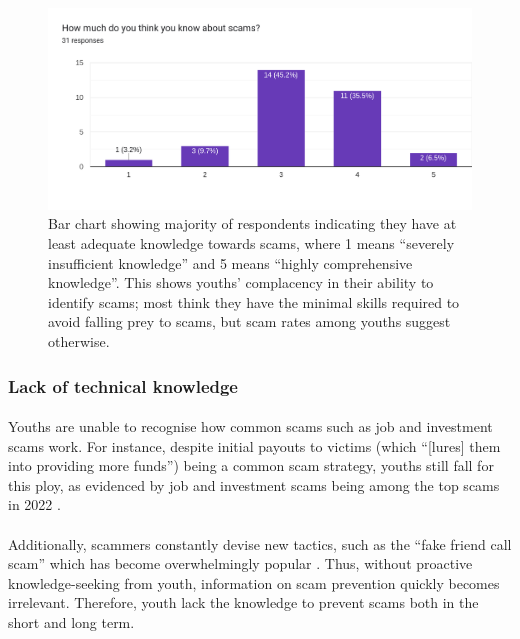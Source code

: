 \message{ !name(written-report.tex)}\documentclass[a4paper]{article}
\begin{document}
\begin{figure}[ht]
  \centering \includegraphics[width=\textwidth]{scamknowledgegraph}
  \caption{Bar chart showing majority of respondents indicating they have at
    least adequate knowledge towards scams, where 1 means ``severely
    insufficient knowledge'' and 5 means ``highly comprehensive knowledge''.
    This shows youths' complacency in their ability to identify scams; most
    think they have the minimal skills required to avoid falling prey to scams,
    but scam rates among youths suggest
    otherwise.}\label{fig:scamknowledgegraph}
\end{figure}


\subsubsection{Lack of technical knowledge}
\paragraph{} Youths are unable to recognise how common scams such as job and
investment scams work. For instance, despite initial payouts to victims (which
``[lures] them into providing more funds'') being a common scam strategy, youths
still fall for this ploy, as evidenced by job and investment scams being among
the top scams in 2022 \parencite{Hui.2023}.

\paragraph{} Additionally, scammers constantly devise new tactics, such as the
``fake friend call scam'' which has become overwhelmingly popular
\parencite{Goddard.2023}. Thus, without proactive knowledge-seeking from youth,
information on scam prevention quickly becomes irrelevant. Therefore, youth lack
the knowledge to prevent scams both in the short and long term.
\end{document}
